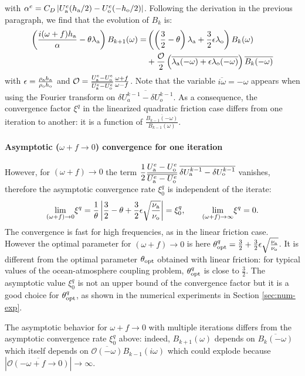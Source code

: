 with $\alpha^e=C_D\left|U_{\rm a}^e(h_{\rm a}/2) - U_{\rm o}^e(-h_{\rm o}/2)\right|$.
Following the derivation in the previous paragraph,
we find that the evolution of $B_k$ is:
\begin{equation}
	\label{eq:OASchwarz_ConvergenceAnalysis_linearizedCV}
	\begin{aligned}
    \left(\frac{i(\omega+f)h_{\rm a}}{\alpha} -
	\theta \lambda_{\rm a}\right)B_{k+1}(\omega)
		=&
    \left(\left(\frac{3}{2} - \theta\right) 
    \lambda_{\rm a}
    + \frac{3}{2} \epsilon \lambda_{\rm o} \right) B_k(\omega)\\
		&+ \frac{
    \mathcal{O}
    }{2}
    \left(
    \overline{
    \lambda_{\rm a}(-{\omega})
    +
    \epsilon\lambda_{\rm o}(-{\omega})}
    \right)
    \overline{B_k(-{\omega})}
\end{aligned}
\end{equation}
with $\epsilon = \frac{\rho_{\rm a} h_{\rm a}}{\rho_{\rm o} h_{\rm o}}$ 
and $\mathcal{O} = 
\frac{U_{\rm a}^e - U_{\rm o}^e}{\overline{U_{\rm a}^e - U_{\rm o}^e}} \frac{\omega+f}{\omega - f}$.
Note that the variable $\overline{i \omega}=-\omega$ appears when using the Fourier
transform on $\overline{\delta U_a^{k-1} - \delta U_o^{k-1}}$.
As a consequence,
the convergence factor $\xi^q$ in the linearized 
quadratic friction case differs from one iteration to another:
it is a function of
$\frac{\overline{B_{k-1}(-\omega)}}{B_{k-1}(\omega)}$.
\paragraph{Asymptotic ($\omega+f \rightarrow 0$) convergence for
	one iteration}
However, for $(\omega+f) \rightarrow 0$ the term 
$\displaystyle \frac{1}{2}\frac{U_{\rm a}^e - U_{\rm o}^e}{\overline{U_{\rm a}^e - U_{\rm o}^e}}\,
\overline{
\delta U_{\rm a}^{k-1} - \delta U_{\rm o}^{k-1}}$
vanishes, therefore the asymptotic convergence 
rate $\xi_0^q$ is independent of the iterate:
\[
 \underset{(\omega+f) \rightarrow 0}{\mathrm{lim}} \xi^q = \frac{1}{\theta} \left| \frac{3}{2}-\theta+\frac{3}{2}\epsilon\sqrt{\frac{\nu_{\rm a}}{\nu_{\rm o}}} \right| = \xi_0^q, \qquad
 \underset{(\omega+f) \rightarrow \infty}{\mathrm{lim}} \xi^q = 0.
\]
The convergence is fast for high frequencies,
as in the linear friction case. However
the optimal parameter for $(\omega+f) \rightarrow 0$ is
here $\theta_{\rm opt}^q = \frac{3}{2} +
\frac{3}{2}\epsilon\sqrt{\frac{\nu_{\rm a}}{\nu_{\rm o}}}$.
It is different from the optimal parameter $\theta_{\rm opt}$
obtained with linear friction: for typical values of the
ocean-atmosphere coupling problem, $\theta_{\rm opt}^q$
is close to $\frac{3}{2}$.
The asymptotic value $\xi_0^q$ is not an upper bound of the
convergence factor but it is a good choice for $\theta_{\rm opt}^q$,
as shown in the numerical experiments in Section \ref{sec:num-exp}.
\par
The asymptotic behavior for $\omega+f \rightarrow 0$ with
multiple iterations differs from the asymptotic convergence
rate $\xi_0^q$ above:
indeed, $B_{k+1}(\omega)$ depends on
$\overline{B_k(- \omega)}$ which itself depends on
$\overline{\mathcal{O}(-\omega)} B_{k-1}(i\omega)$
which could explode because
$|\overline{\mathcal{O}(-\omega+ f \rightarrow 0)}|
\rightarrow \infty$.
